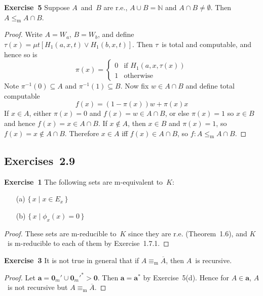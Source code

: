 \documentclass[letterpaper]{article}
\newcommand{\exercise}[2][]{\noindent\textbf{Exercise~{#2}}\ifthenelse{\isempty{#1}}{\textbf{.}}{ ({#1})\textbf{.}}}
\newcommand{\N}{\mathbb{N}}
\newcommand{\union}{\cup}
\newcommand{\sect}{\cap}
\newcommand{\mr}{\mathrel{\le_{\mathrm{m}}}}
\newcommand{\me}{\mathrel{\equiv_{\mathrm{m}}}}
\newcommand{\dg}[1]{\mathbf{{#1}}}
\theoremstyle{plain}
\theoremstyle{definition}
\theoremstyle{remark}
\begin{document}
\exercise{5}
Suppose $A$~and~$B$ are r.e., $A\union B=\N$ and $A\sect B\ne\emptyset$. Then $A\mr A\sect B$.
\begin{proof}
Write $A=W_a$, $B=W_b$, and define $\tau(x)=\mu t[H_1(a,x,t)\lor H_1(b,x,t)]$. Then $\tau$~is total and computable, and hence so is
$$\pi(x)=\begin{cases}
0&\text{if }H_1(a,x,\tau(x))\\
1&\text{otherwise}
\end{cases}$$
Note $\pi^{-1}(0)\subseteq A$ and $\pi^{-1}(1)\subseteq B$. Now fix $w\in A\sect B$ and define total computable
$$f(x)=(1-\pi(x))w+\pi(x)x$$
If $x\in A$, either $\pi(x)=0$ and $f(x)=w\in A\sect B$, or else $\pi(x)=1$ so $x\in B$ and hence $f(x)=x\in A\sect B$. If $x\not\in A$, then $x\in B$ and $\pi(x)=1$, so $f(x)=x\not\in A\sect B$. Therefore $x\in A$ iff $f(x)\in A\sect B$, so $f:A\mr A\sect B$.
\end{proof}

\subsection*{Exercises~2.9}
\exercise{1}
The following sets are m-equivalent to~$K$:
\begin{enumerate}[itemsep=0pt]
\item[(a)] $\{\,x\mid x\in E_x\,\}$
\item[(b)] $\{\,x\mid\phi_x(x)=0\,\}$
\end{enumerate}
\begin{proof}
These sets are m-reducible to~$K$ since they are r.e. (Theorem~1.6), and $K$~is m-reducible to each of them by Exercise~1.7.1.
\end{proof}

\exercise{3}
It is not true in general that if $A\me\overline{A}$, then $A$~is recursive.
\begin{proof}
Let $\dg{a}=\dg{0}_m'\union\dg{0}_m'^*>\dg{0}$. Then $\dg{a}=\dg{a}^*$ by Exercise~5(d). Hence for $A\in\dg{a}$, $A$~is not recursive but $A\me\overline{A}$.
\end{proof}
\end{document}
